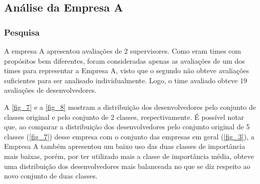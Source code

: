 \subsection{Análise da Empresa A}

\subsubsection{Pesquisa}

A empresa A apresentou avaliações de 2 supervisores. Como eram times com propósitos bem diferentes, foram consideradas apenas as avaliações de um dos times para representar a Empresa A, visto que o segundo não obteve avaliações suficientes para ser analisado individualmente. Logo, o time avaliado obteve 19 avaliações de desenvolvedores.

A \autoref{fig_7} e a \autoref{fig_8} mostram a distribuição dos desenvolvedores pelo conjunto de classes original e pelo conjunto de 2 classes, respectivamente. É possível notar que, ao comparar a distribuição dos desenvolvedores pelo conjunto original de 5 classes (\autoref{fig_7}) desse empresa com o conjunto das empresas em geral (\autoref{fig_3}), a Empresa A também apresentou um baixo uso das duas classes de importância mais baixas, porém, por ter utilizado mais a classe de importância média, obteve uma distribuição dos desenvolvedores mais balanceada no que se diz respeito ao novo conjunto de duas classes.

